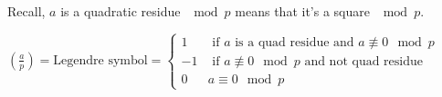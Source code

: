     Recall, $a$ is a quadratic residue $\mod p$ means that it's a square
    $\mod p$.\\
    \begin{definition}
      $\left(\frac{a}{p}\right) = \text{Legendre symbol} = \begin{cases}
      1 & \text{ if $a$ is a quad residue and $a \not\equiv 0 \mod p$}\\
      -1 & \text{ if $a \not\equiv 0 \mod p$ and not quad residue}\\
      0 & a \equiv 0 \mod p
      \end{cases}$
    \end{definition}
